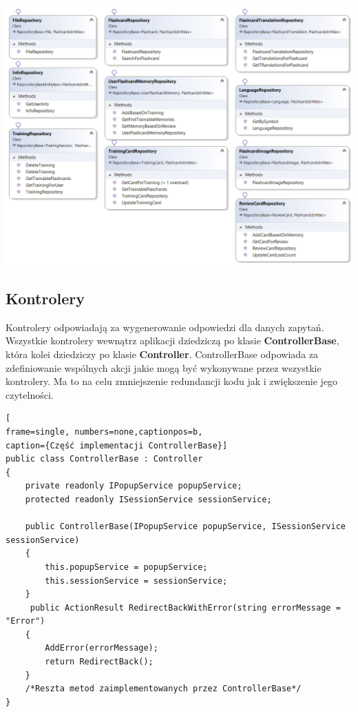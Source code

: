 \begin{landscape}
\begin{center}
	\includegraphics[width=\textwidth + 3cm]{images/Repos.png}
\end{center}
\end{landscape}


\subsection{Kontrolery}

Kontrolery odpowiadają za wygenerowanie odpowiedzi dla danych zapytań. Wszystkie kontrolery wewnątrz aplikacji dziedziczą po klasie \textbf{ControllerBase}, która kolei dziedziczy po klasie \textbf{Controller}. ControllerBase odpowiada za zdefiniowanie wspólnych akcji jakie mogą być wykonywane przez wszystkie kontrolery. Ma to na celu zmniejszenie redundancji kodu jak i zwiększenie jego czytelności.

\begin{minipage}{\linewidth}
\begin{lstlisting}[
frame=single, numbers=none,captionpos=b, 
caption={Część implementacji ControllerBase}]
public class ControllerBase : Controller
{
	private readonly IPopupService popupService;
	protected readonly ISessionService sessionService;

	public ControllerBase(IPopupService popupService, ISessionService sessionService)
	{
		this.popupService = popupService;
		this.sessionService = sessionService;
	}
	 public ActionResult RedirectBackWithError(string errorMessage = "Error")
	{
		AddError(errorMessage);
		return RedirectBack();
	}
	/*Reszta metod zaimplementowanych przez ControllerBase*/
}
\end{lstlisting}
\end{minipage}

